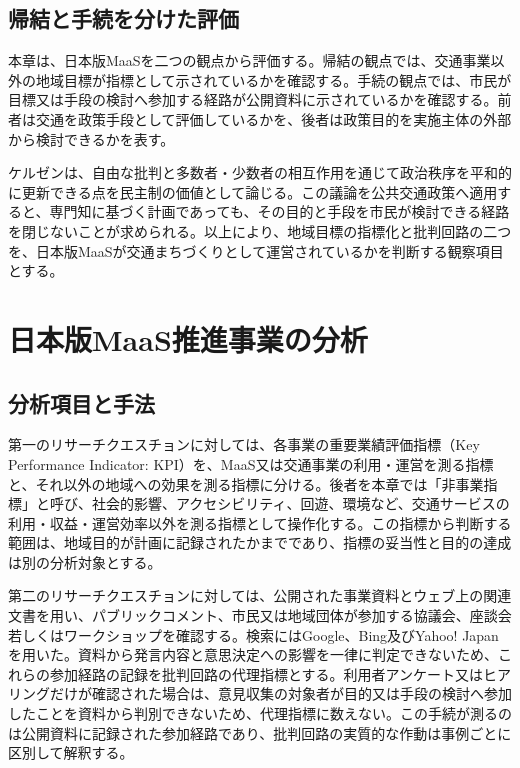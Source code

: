 \subsection{帰結と手続を分けた評価}
\label{subsec:ch4_procedure_stance}

本章は、日本版MaaSを二つの観点から評価する。帰結の観点では、交通事業以外の地域目標が指標として示されているかを確認する。手続の観点では、市民が目標又は手段の検討へ参加する経路が公開資料に示されているかを確認する。前者は交通を政策手段として評価しているかを、後者は政策目的を実施主体の外部から検討できるかを表す。

ケルゼンは、自由な批判と多数者・少数者の相互作用を通じて政治秩序を平和的に更新できる点を民主制の価値として論じる\cite{kelsen2015}。この議論を公共交通政策へ適用すると、専門知に基づく計画であっても、その目的と手段を市民が検討できる経路を閉じないことが求められる。以上により、地域目標の指標化と批判回路の二つを、日本版MaaSが交通まちづくりとして運営されているかを判断する観察項目とする。

\section{日本版MaaS推進事業の分析}
\label{sec:ch4_maas_analysis}

\subsection{分析項目と手法}
\label{subsec:ch4_methodology}

第一のリサーチクエスチョンに対しては、各事業の重要業績評価指標（Key Performance Indicator: KPI）を、MaaS又は交通事業の利用・運営を測る指標と、それ以外の地域への効果を測る指標に分ける。後者を本章では「非事業指標」と呼び、社会的影響、アクセシビリティ、回遊、環境など、交通サービスの利用・収益・運営効率以外を測る指標として操作化する。この指標から判断する範囲は、地域目的が計画に記録されたかまでであり、指標の妥当性と目的の達成は別の分析対象とする。

第二のリサーチクエスチョンに対しては、公開された事業資料とウェブ上の関連文書を用い、パブリックコメント、市民又は地域団体が参加する協議会、座談会若しくはワークショップを確認する。検索にはGoogle、Bing及びYahoo! Japanを用いた。資料から発言内容と意思決定への影響を一律に判定できないため、これらの参加経路の記録を批判回路の代理指標とする。利用者アンケート又はヒアリングだけが確認された場合は、意見収集の対象者が目的又は手段の検討へ参加したことを資料から判別できないため、代理指標に数えない。この手続が測るのは公開資料に記録された参加経路であり、批判回路の実質的な作動は事例ごとに区別して解釈する。

